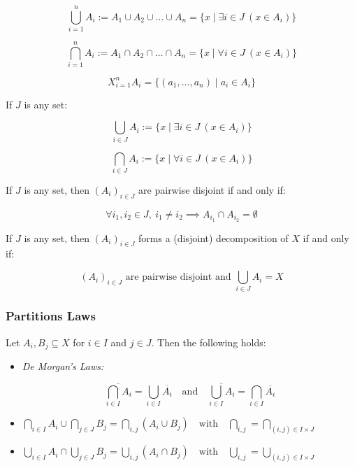 \[
	\bigcup_{i=1}^{n} A_i := A_1 \cup A_2 \cup \dots \cup A_n = \{ x \mid \exists i \in J \ (x \in A_i) \}
\]

\[
	\bigcap_{i=1}^{n} A_i := A_1 \cap A_2 \cap \dots \cap A_n = \{ x \mid \forall i \in J \ (x \in A_i) \}
\]

\[
	X_{i=1}^{n} A_i = \{(a_1, \dots, a_n) \mid a_i \in A_i \}
\]

If \( J \) is any set:

\[
	\bigcup_{i \in J} A_i := \{ x \mid \exists i \in J \ (x \in A_i) \}
\]

\[
	\bigcap_{i \in J} A_i := \{ x \mid \forall i \in J \ (x \in A_i) \}
\]

If \( J \) is any set, then \( {(A_i)}_{i \in J} \) are pairwise disjoint if and only if:

\[
	\forall i_1, i_2 \in J, \ i_1 \neq i_2 \implies A_{i_1} \cap A_{i_2} = \emptyset
\]

If \( J \) is any set, then \( {(A_i)}_{i \in J} \) forms a (disjoint) decomposition of \( X \) if and only if:

\[
	{(A_i)}_{i \in J} \text{ are pairwise disjoint and } \bigcup_{i \in J} A_i = X
\]

\subsubsection{Partitions Laws}

Let \( A_i, B_j \subseteq X \) for \( i \in I \) and \( j \in J \). Then the following holds:

\begin{itemize}

	\item\emph{De Morgan's Laws:}

	\[
		\overline{\bigcap_{i \in I} A_i}= \bigcup_{i \in I} \overline{A_i} \quad \text{and} \quad 
		\overline{\bigcup_{i \in I} A_i} = \bigcap_{i \in I} \overline{A_i}
	\]

	\item\(
		\bigcap_{i \in I} A_i \cup \bigcap_{j \in J} B_j = \bigcap_{i,j} (A_i \cup B_j) \quad \text{with} 
		\quad \bigcap_{i,j} = \bigcap_{(i,j) \in I \times J}
	\)


	\item\(
		\bigcup_{i \in I} A_i \cap \bigcup_{j \in J} B_j = \bigcup_{i,j} (A_i \cap B_j) \quad \text{with} 
		\quad \bigcup_{i,j} = \bigcup_{(i,j) \in I \times J}
	\)

\end{itemize}

